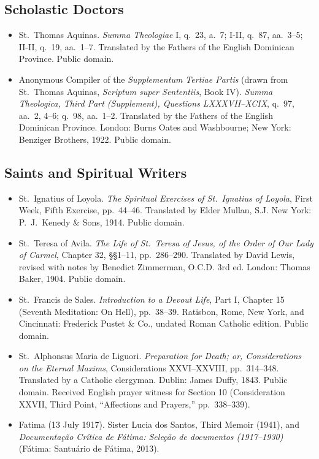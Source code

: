 \subsection*{Scholastic Doctors}

\begin{itemize}
\item St.\ Thomas Aquinas. \textit{Summa Theologiae} I, q.\ 23, a.\ 7; I-II, q.\ 87, aa.\ 3--5; II-II, q.\ 19, aa.\ 1--7. Translated by the Fathers of the English Dominican Province. Public domain.
\item Anonymous Compiler of the \textit{Supplementum Tertiae Partis} (drawn from St.\ Thomas Aquinas, \textit{Scriptum super Sententiis}, Book IV). \textit{Summa Theologica, Third Part (Supplement), Questions LXXXVII--XCIX}, q.\ 97, aa.\ 2, 4--6; q.\ 98, aa.\ 1--2. Translated by the Fathers of the English Dominican Province. London: Burns Oates and Washbourne; New York: Benziger Brothers, 1922. Public domain.
\end{itemize}

\subsection*{Saints and Spiritual Writers}

\begin{itemize}
\item St.\ Ignatius of Loyola. \textit{The Spiritual Exercises of St.\ Ignatius of Loyola}, First Week, Fifth Exercise, pp.\ 44--46. Translated by Elder Mullan, S.J. New York: P.\ J.\ Kenedy \& Sons, 1914. Public domain.
\item St.\ Teresa of Avila. \textit{The Life of St.\ Teresa of Jesus, of the Order of Our Lady of Carmel}, Chapter 32, \S\S 1--11, pp.\ 286--290. Translated by David Lewis, revised with notes by Benedict Zimmerman, O.C.D. 3rd ed. London: Thomas Baker, 1904. Public domain.
\item St.\ Francis de Sales. \textit{Introduction to a Devout Life}, Part I, Chapter 15 (Seventh Meditation: On Hell), pp.\ 38--39. Ratisbon, Rome, New York, and Cincinnati: Frederick Pustet \& Co., undated Roman Catholic edition. Public domain.
\item St.\ Alphonsus Maria de Liguori. \textit{Preparation for Death; or, Considerations on the Eternal Maxims}, Considerations XXVI--XXVIII, pp.\ 314--348. Translated by a Catholic clergyman. Dublin: James Duffy, 1843. Public domain. Received English prayer witness for Section 10 (Consideration XXVII, Third Point, ``Affections and Prayers,'' pp.\ 338--339).
\item Fatima (13 July 1917). Sister Lucia dos Santos, Third Memoir (1941), and \textit{Documenta\c{c}\~{a}o Cr\'{i}tica de F\'{a}tima: Sele\c{c}\~{a}o de documentos (1917--1930)} (F\'{a}tima: Santu\'{a}rio de F\'{a}tima, 2013).
\end{itemize}
\endgroup
